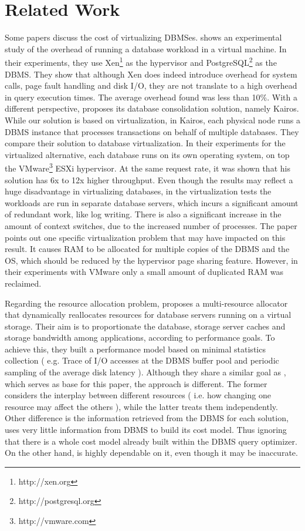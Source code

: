 \chapter{\textbf{Related Work}}

\label{chap:relwork}

Some papers discuss the cost of virtualizing DBMSes. \cite{4498282} shows an experimental study of the overhead of running a database workload in a virtual machine. In their experiments, they use Xen\footnote{http://xen.org} as the hypervisor and PostgreSQL\footnote{http://postgresql.org} as the DBMS. They show that although Xen does indeed introduce overhead for system calls, page fault handling and disk I/O, they are not translate to a high overhead in query execution times. The average overhead found was less than 10\%.  With a different perspective, \cite{Curino:2011:WDM:1989323.1989357} proposes its database consolidation solution, namely Kairos. While our solution is based on virtualization, in Kairos, each physical node runs a DBMS instance that processes transactions on behalf of multiple databases. They compare their solution to database virtualization. In their experiments for the virtualized alternative, each database runs on its own operating system, on top the VMware\footnote{http://vmware.com} 
ESXi hypervisor. At the same request rate, it was shown that his solution has 6x to 12x higher throughput. Even though the results may reflect a huge disadvantage in virtualizing databases, in the virtualization tests the workloads are run in separate database servers, which incurs a significant amount of redundant work, like log writing. There is also a significant increase in the amount of context switches, due to the increased number of processes. The paper points out one specific virtualization problem that may have impacted on this result. It causes RAM to be allocated for multiple copies of the DBMS and the OS, which should be reduced by the hypervisor page sharing feature. However, in their experiments with VMware only a small amount of duplicated RAM was reclaimed.

Regarding the resource allocation problem, \cite{Soundararajan:2009:DRA:1525908.1525914} proposes a multi-resource allocator that dynamically reallocates resources for database servers running on a virtual storage. Their aim is to proportionate the database, storage server caches and storage bandwidth among applications, according to performance goals. To achieve this, they built a performance model based on minimal statistics collection (  e.g. Trace of I/O accesses at the DBMS buffer pool and periodic sampling of the average disk latency ). Although they share a similar goal as  \cite{Soror:2008:AVM:1376616.1376711}, which serves as base for this paper, the approach is different. The former considers the interplay between different resources ( i.e. how changing one resource may affect the others ), while the latter treats them independently. Other difference is the information retrieved from the DBMS for each solution, \cite{Soundararajan:2009:DRA:1525908.1525914} uses very little information from DBMS to build its cost model. Thus ignoring that there is a whole cost model already built within the DBMS query optimizer. On the other hand,\cite{Soror:2008:AVM:1376616.1376711} is highly dependable on it, even though it may be inaccurate.